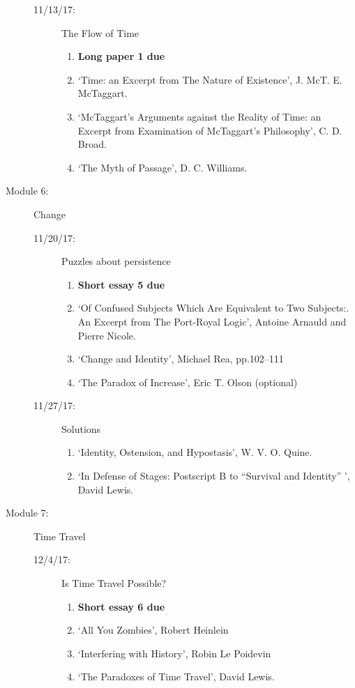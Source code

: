 \documentclass[article,oneside]{memoir}
\begin{document}
\begin{description}
\begin{description}
\item[11/13/17:] The Flow of Time
\begin{enumerate}
\item \textbf{Long paper 1 due}
\item `Time: an Excerpt from The Nature of Existence', J. McT. E. McTaggart.
\item `McTaggart’s Arguments against the Reality of Time: an Excerpt from Examination of McTaggart’s Philosophy', C. D. Broad.
\item `The Myth of Passage', D. C. Williams.
\end{enumerate}
\end{description}

\item[Module 6:] Change
\begin{description}
\item[11/20/17:] Puzzles about persistence
\begin{enumerate}
\item \textbf{Short essay 5 due}
\item `Of Confused Subjects Which Are Equivalent to Two Subjects:. An Excerpt from The Port-Royal Logic', Antoine Arnauld and Pierre Nicole. 
\item `Change and Identity', Michael Rea, pp.102--111 
\item `The Paradox of Increase', Eric T. Olson (optional)
\end{enumerate}
\item[11/27/17:] Solutions
\begin{enumerate}
 \item `Identity, Ostension, and Hypostasis', W. V. O. Quine.
\item `In Defense of Stages: Postscript B to ``Survival and Identity'' ', David Lewis.
\end{enumerate}
\end{description}

\item[Module 7:] Time Travel
\begin{description}
\item[12/4/17:] Is Time Travel Possible?
\begin{enumerate}
\item \textbf{Short essay 6 due}
\item `All You Zombies', Robert Heinlein 
\item `Interfering with History', Robin Le Poidevin 
\item `The Paradoxes of Time Travel', David Lewis.


\end{enumerate}
\end{description}
\end{description}
\end{document}
